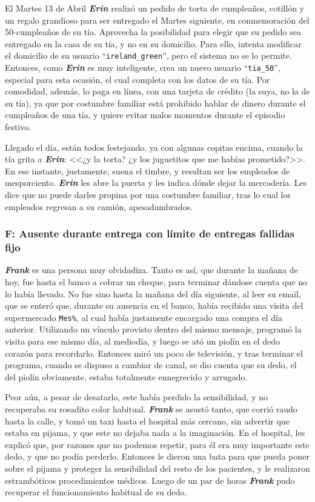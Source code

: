 El Martes 13 de Abril \textbf{\emph{Erin}} realizó un pedido de torta de
cumpleaños, cotillón y un regalo grandioso para ser entregado el Martes
siguiente, en conmemoración del 50-cumpleaños de su tía. Aprovecha la
posibilidad para elegir que su pedido sea entregado en la casa de su tía, y no
en su domicilio. Para ello, intenta modificar el domicilio de su usuario
``\texttt{ireland\_green}'', pero el sistema no se lo permite. Entonces, como
\textbf{\emph{Erin}} es muy inteligente, crea un nuevo usuario
``\texttt{tia\_50}'', especial para esta ocasión, el cual completa con los
datos de su tía. Por comodidad, además, lo paga en línea, con una tarjeta de
crédito (la suya, no la de su tía), ya que por costumbre familiar está
prohibido hablar de dinero durante el cumpleaños de una tía, y quiere evitar
malos momentos durante el episodio festivo.

Llegado el día, están todos festejando, ya con algunas copitas encima, cuando
la tía grita a \textbf{\emph{Erin}}: <<¿y la torta? ¿y los juguetitos que me
habías prometido?>>. En ese instante, justamente, suena el timbre, y resultan
ser los empleados de mesporciento. \textbf{\emph{Erin}} les abre la puerta y
les indica dónde dejar la mercadería. Les dice que no puede darles propina por
una costumbre familiar, tras lo cual los empleados regresan a su camión,
apesadumbrados.

\subsubsection{F: Ausente durante entrega con límite de entregas fallidas fijo}

\textbf{\emph{Frank}} es una persona muy olvidadiza. Tanto es así, que durante
la mañana de hoy, fue hasta el banco a cobrar un cheque, para terminar dándose
cuenta que no lo había llevado. No fue sino hasta la mañana del día siguiente,
al leer su email, que se enteró que, durante su ausencia en el banco, había
recibido una visita del supermercado \texttt{Mes\%}, al cual había justamente
encargado una compra el día anterior. Utilizando un vínculo provisto dentro
del mismo mensaje, programó la visita para ese mismo día, al mediodía, y luego
se ató un piolín en el dedo corazón para recordarlo. Entonces miró un poco de
televisión, y tras terminar el programa, cuando se dispuso a cambiar de canal,
se dio cuenta que su dedo, el del piolín obviamente, estaba totalmente
ennegrecido y arrugado.

Peor aún, a pesar de desatarlo, este había perdido la sensibilidad, y no
recuperaba su rosadito color habitual. \textbf{\emph{Frank}} se asustó tanto,
que corrió raudo hasta la calle, y tomó un taxi hasta el hospital más cercano,
sin advertir que estaba en pijama, y que este no dejaba nada a la imaginación.
En el hospital, les explicó que, por razones que no podemos repetir, para él
era muy importante este dedo, y que no podía perderlo. Entonces le dieron una
bata para que pueda poner sobre el pijama y proteger la sensibilidad del resto
de los pacientes, y le realizaron estrambóticos procedimientos médicos. Luego
de un par de horas \textbf{\emph{Frank}} pudo recuperar el funcionamiento
habitual de su dedo.

